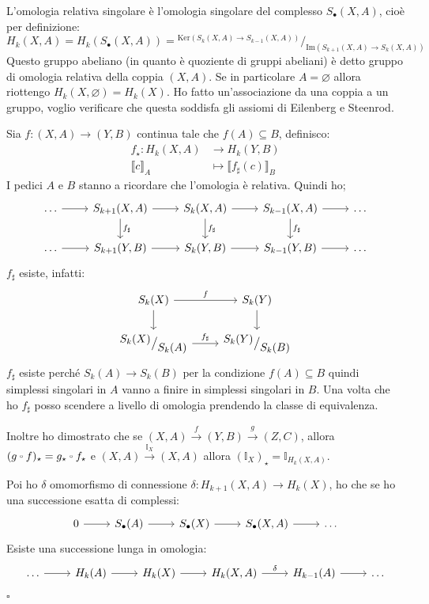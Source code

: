 \documentclass[10pt, twoside=false, x11names]{scrbook}
\newenvironment{proof}{{\textbf{Dimostrazione}:}}{\hfill $\square$}
\newcommand{\im}[1]{\mathrm{Im}( #1 )}
\renewcommand{\ker}[1]{\mathrm{Ker}( #1)}
\newcommand{\Id}[1][]{\mathbb{I}_#1}
\newcommand*\quot[2]{{^{\textstyle #1}\big/_{\textstyle #2}}}
\let\latexcirc=\circ
\newcommand{\ccirc}{\mathbin{\mathchoice
  {\xcirc\scriptstyle}
  {\xcirc\scriptstyle}
  {\xcirc\scriptscriptstyle}
  {\xcirc\scriptscriptstyle}
}}
\newcommand{\xcirc}[1]{\vcenter{\hbox{$#1\latexcirc$}}}
\let\circ\ccirc
\let\emptyset\varnothing
\begin{document}
\begin{proof}
  L'omologia relativa singolare è l'omologia singolare del complesso $ S_\bullet(X, A) $,
  cioè per definizione:
  \[
    H_k(X,A) = H_k(S_\bullet(X,A)) = \quot{\ker{S_k(X,A) \to S_{k-1}(X,A)}}{\im{S_{k+1}(X,A) \to S_{k}(X,A)}}
  \]
  Questo gruppo abeliano (in quanto è quoziente di gruppi abeliani) è detto
  gruppo di omologia relativa della coppia  $ (X, A) $. Se in particolare $ A = \emptyset $
  allora riottengo $ H_k(X, \emptyset) = H_k(X) $.
  Ho fatto un'associazione da una coppia a un gruppo, voglio verificare che questa
  soddisfa gli assiomi di Eilenberg e Steenrod.

  Sia $ f \colon (X,A) \to (Y,B) $ continua tale che $ f(A) \subseteq B $, definisco:
  \begin{align*}
    f_\star \colon H_k(X,A) & \to H_k(Y,B) \\
    \llbracket c \rrbracket_ A & \mapsto  \llbracket f_\sharp(c) \rrbracket_ B
  \end{align*}
  I pedici $ A $ e $ B $ stanno a ricordare che l'omologia è relativa.
  Quindi ho;
  \[
    \begin{tikzcd}
      \dots \arrow{r}{} & S_{k+1}(X,A) \arrow{r}{} \arrow{d}{f_\sharp} & S_k(X,A) \arrow{r}{}  \arrow{d}{f_\sharp} & S_{k-1}(X,A) \arrow{r}{}  \arrow{d}{f_\sharp} & \dots \\
      \dots \arrow{r}{} & S_{k+1}(Y,B) \arrow{r}{} & S_k(Y,B) \arrow{r}{} & S_{k-1}(Y,B) \arrow{r}{} & \dots
    \end{tikzcd}
  \]
  $ f_\sharp $ esiste, infatti:
  \[
    \begin{tikzcd}
      S_{k}(X) \arrow{r}{f} \arrow{d}{} & S_k(Y)  \arrow{d}{}  \\
      \quot{S_k(X)}{S_k(A)} \arrow{r}{f_\sharp} & \quot{S_k(Y)}{S_k(B)}
    \end{tikzcd}
  \]
  $ f_\sharp $ esiste perché $ S_k(A) \to S_k(B) $ per la condizione $ f(A) \subseteq B $
  quindi simplessi singolari in $ A $ vanno a finire in simplessi singolari in $ B $.
  Una volta che ho $ f_\sharp $ posso scendere a livello di omologia prendendo la
  classe di equivalenza.

  Inoltre ho dimostrato che se $ (X,A) \overset{f}{\to} (Y,B) \overset{g}{\to} (Z,C) $,
  allora $ (g \circ f)_\star = g_\star \circ f_\star $ e $ (X,A) \overset{\Id{X}}{\to} (X,A) $
  allora $ (\Id{X})_\star = \Id{H_k(X,A)} $.

  Poi ho $ \delta $ omomorfismo di connessione $ \delta \colon H_{k+1}(X,A) \to H_k(X) $,
  ho che se ho una successione esatta di complessi:
  \[
    \begin{tikzcd}
      0 \arrow{r}{} & S_\bullet(A) \arrow{r}{} & S_\bullet(X) \arrow{r}{} & S_\bullet(X,A) \arrow{r}{} & \dots
    \end{tikzcd}
  \]
  Esiste una successione lunga in omologia:
  \[
    \begin{tikzcd}
      \dots \arrow{r}{} & H_k(A) \arrow{r}{} & H_k(X) \arrow{r}{} & H_k(X,A) \arrow{r}{\delta} & H_{k-1}(A) \rar &  \dots
    \end{tikzcd}
  \]


\end{proof}
\end{document}
